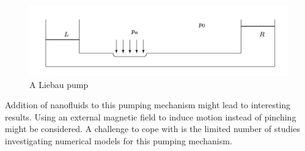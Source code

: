 \begin{figure}
	\centering
  \includegraphics[scale=0.45]{figures/liebau}
\vspace*{6mm}
\caption{A Liebau pump \cite{numInvLiebauPhenom}}
\label{fig:liebau}       %
\end{figure}
 
 Addition of nanofluids to this pumping mechanism might lead to interesting results. Using an external magnetic field to induce motion instead of pinching might be considered. A challenge to cope with is the limited number of studies investigating numerical models for this pumping mechanism.
 